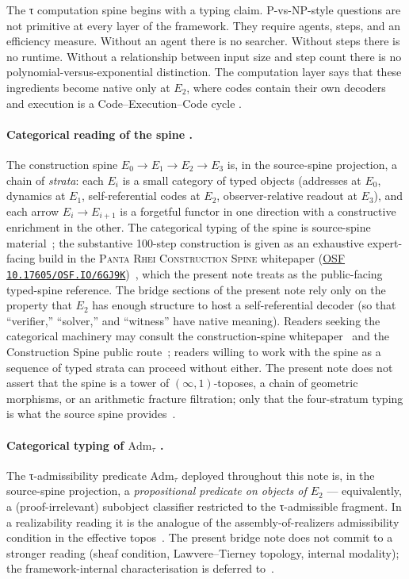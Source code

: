 \documentclass{pantarhei-researchnote}
\newcommand{\Adm}{\ensuremath{\mathrm{Adm}_{\tau}}}
\newcommand{\Ezero}{\ensuremath{E_0}}
\newcommand{\Eone}{\ensuremath{E_1}}
\newcommand{\Etwo}{\ensuremath{E_2}}
\newcommand{\Ethree}{\ensuremath{E_3}}
\begin{document}
The τ computation spine begins with a typing claim. P-vs-NP-style
questions are not primitive at every layer of the framework. They require
agents, steps, and an efficiency measure. Without an agent there is no
searcher. Without steps there is no runtime. Without a relationship
between input size and step count there is no polynomial-versus-exponential
distinction. The computation layer says that these ingredients become
native only at \Etwo, where codes contain their own decoders and execution
is a Code--Execution--Code cycle \cite{PR-III}.

\paragraph{Categorical reading of the spine \scopetau.}
The construction spine $\Ezero \to \Eone \to \Etwo \to \Ethree$ is, in the
source-spine projection, a chain of \emph{strata}: each $E_i$ is a small
category of typed objects (addresses at $\Ezero$, dynamics at $\Eone$,
self-referential codes at $\Etwo$, observer-relative readout at
$\Ethree$), and each arrow $E_i \to E_{i+1}$ is a forgetful functor in
one direction with a constructive enrichment in the other. The
categorical typing of the spine is source-spine material~\cite{PR-III};
the substantive 100-step construction is given as an exhaustive
expert-facing build in the
\textsc{Panta Rhei Construction Spine} whitepaper
(\href{https://doi.org/10.17605/OSF.IO/6GJ9K}{OSF
\texttt{10.17605/OSF.IO/6GJ9K}})~\cite{PR-ConstructionSpineWhitepaper},
which the present note treats as the public-facing typed-spine
reference. The bridge sections of the present note rely only on the
property that $\Etwo$ has enough structure to host a self-referential
decoder (so that ``verifier,'' ``solver,'' and ``witness'' have native
meaning). Readers seeking the categorical machinery may consult the
construction-spine whitepaper~\cite{PR-ConstructionSpineWhitepaper}
and the Construction Spine public
route~\cite{PR-ConstructionSpinePublic}; readers willing to work with
the spine as a sequence of typed strata can proceed without either. The
present note does not assert that the spine is a tower of
$(\infty,1)$-toposes, a chain of geometric morphisms, or an arithmetic
fracture filtration; only that the four-stratum typing is what the
source spine provides~\cite{AwodeyCategoryTheory,HylandEffectiveTopos}.

\paragraph{Categorical typing of \(\Adm\) \scopetau.}
The τ-admissibility predicate $\Adm$ deployed throughout this note is,
in the source-spine projection, a \emph{propositional predicate on objects
of $\Etwo$} — equivalently, a (proof-irrelevant) subobject classifier
restricted to the τ-admissible fragment. In a realizability reading it is
the analogue of the assembly-of-realizers admissibility condition in the
effective topos~\cite{HylandEffectiveTopos}. The present bridge note does
not commit to a stronger reading (sheaf condition, Lawvere--Tierney
topology, internal modality); the framework-internal characterisation is
deferred to~\cite{PR-III}.
\end{document}
